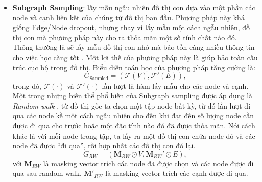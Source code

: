 \begin{itemize}
    \item[] \textbf{Subgraph Sampling}: lấy mẫu ngẫu nhiên đồ thị con dựa vào một phần các node và cạnh liên kết của chúng từ đồ thị ban đầu. Phương pháp này khá giống Edge/Node dropout, nhưng thay vì lấy mẫu một cách ngẫu nhiên, đồ thị con mà phương pháp này cho ra thỏa mãn một số tính chất nào đó. Thông thường là sẽ lấy mẫu đồ thị con nhỏ mà bảo tồn càng nhiều thông tin cho việc học càng tốt \cite{data-aug-for-GNN, GNN-via-topo-denoising}. Một lợi thế của phương pháp này là giúp bảo toàn cấu trúc cục bộ trong đồ thị. Biểu diễn toán học của phương pháp tăng cường là:
    \begin{equation}
        G_{\text{Sampled}} = (\bm{\mathcal{F}}(V), \bm{\mathcal{F'}}(E)),
    \end{equation}
    trong đó, $\bm{\mathcal{F}}(\cdot)$ và $\bm{\mathcal{F'}}(\cdot)$ lần lượt là hàm lấy mẫu cho các node và cạnh.\\
    Một trong những biến thể phổ biến của Subgraph sampling được áp dụng là \textit{Random walk} \cite{GCC}, từ đồ thị gốc ta chọn một tập node bất kỳ, từ đó lần lượt đi qua các node kề một cách ngẫu nhiên cho đến khi đạt đến số lượng node cần được đi qua cho trước hoặc một đặc tính nào đó đã được thỏa mãn. Nói cách khác là với mỗi node trong tập, ta lấy ra một đồ thị con chứa node đó và các node đã được ``đi qua'', rồi hợp nhất các đồ thị con đó lại.
    \begin{equation}
        G_{RW} = (\mathbf{M}_{RW} \odot V, \mathbf{M}_{RW}' \odot E),
    \end{equation}
    với $\mathbf{M}_{RW}$ là masking vector trích các node đã được chọn và các node được đi qua sau random walk, $\mathbf{M'}_{RW}$ là masking vector trích các cạnh được đi qua.
\end{itemize}




